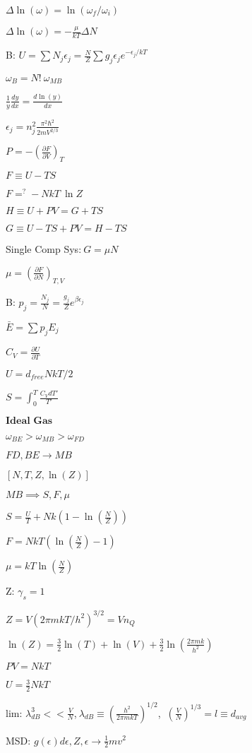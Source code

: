 \documentclass{article}
\begin{document}
\begin{multicols}{3}
$\Delta \ln(\omega) = \ln(\omega_f / \omega_i)$

$\Delta \ln(\omega)=-\frac{\mu}{kT}\Delta N$

B: $U=\sum N_j \epsilon_j = \frac{N}{Z} \sum g_j \epsilon_j e^{-\epsilon_j / kT}$

$\omega_B=N!\: \omega_{MB}$

$\frac{1}{y} \frac{dy}{dx} = \frac{d\ln(y)}{dx}$

$\epsilon_j=n_j^2 \frac{\pi^2 \hbar^2}{2mV^{2/3}}$

$P=-\left (\frac{\partial F}{\partial V}\right )_T$

$F\equiv U-TS$

$F=^? -NkT\:\ln Z$

$H \equiv U+PV = G+TS$

$G \equiv U-TS+PV = H-TS$

Single Comp Sys:$\:G=\mu N$

$\mu = \left ( \frac{\partial F}{\partial N} \right )_{T,V}$

B: $p_j=\frac{N_j}{N}=\frac{g_j}{Z}e^{\beta \epsilon_j}$

$\bar{E}=\sum p_j E_j$

$C_V=\frac{\partial U}{\partial T}$

$U=d_{free}NkT/2$

$S=\int_0^T \frac{C_V dT'}{T'}$

$\textbf{Ideal Gas}$

$\omega_{BE}> \omega_{MB} > \omega_{FD}$

$FD,BE \rightarrow MB$

$[N,T,Z,\ln(Z)]$

$MB \implies S,F,\mu$

$S=\frac{U}{T}+Nk (1-\ln( \frac{N}{Z} ) )$

$F=NkT (\ln ( \frac{N}{Z} ) -1 )$

$\mu=kT \ln ( \frac{N}{Z} )$

Z: $\gamma_s=1$

$Z=V(2\pi mkT/h^2)^{3/2}=Vn_Q$

$\ln(Z)=\frac{3}{2}\ln(T)+\ln(V)+\frac{3}{2}\ln \left ( \frac{2 \pi m k}{h^2} \right )$

$PV=NkT$

$U=\frac{3}{2}NkT$

lim: $\lambda_{dB}^3<<\frac{V}{N}$,$\:\lambda_{dB} \equiv \left ( \frac{h^2}{2 \pi mkT} \right )^{1/2}$, $\: (\frac{V}{N})^{1/3}=l\equiv 
d_{avg}$

MSD: $g(\epsilon)d\epsilon, Z, \epsilon \rightarrow \frac{1}{2}mv^2$


\end{multicols}
\end{document}
